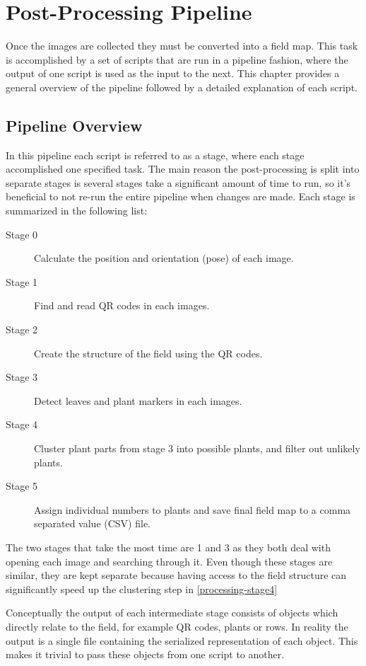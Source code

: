 
\cleardoublepage

\chapter{Post-Processing Pipeline}
\label{processing}

Once the images are collected they must be converted into a field map. This task is accomplished by a set of scripts that are run in a pipeline fashion, where the output of one script is used as the input to the next.  This chapter provides a general overview of the pipeline followed by a detailed explanation of each script.

\section{Pipeline Overview}
\label{processing-overview}

In this pipeline each script is referred to as a stage, where each stage accomplished one specified task.  The main reason the post-processing is split into separate stages is several stages take a significant amount of time to run, so it's beneficial to not re-run the entire pipeline when changes are made. Each stage is summarized in the following list:

\begin{description}
\item[Stage 0] Calculate the position and orientation (pose) of each image.
\item[Stage 1] Find and read QR codes in each images.
\item[Stage 2] Create the structure of the field using the QR codes.
\item[Stage 3] Detect leaves and plant markers in each images.
\item[Stage 4] Cluster plant parts from stage 3 into possible plants, and filter out unlikely plants.
\item[Stage 5] Assign individual numbers to plants and save final field map to a comma separated value (CSV) file. 
\end{description}

The two stages that take the most time are 1 and 3 as they both deal with opening each image and searching through it.  Even though these stages are similar, they are kept separate because having access to the field structure can significantly speed up the clustering step in \ref{processing-stage4} 
 
Conceptually the output of each intermediate stage consists of objects which directly relate to the field, for example QR codes, plants or rows.  In reality the output is a single file containing the serialized representation of each object.  This makes it trivial to pass these objects from one script to another.

